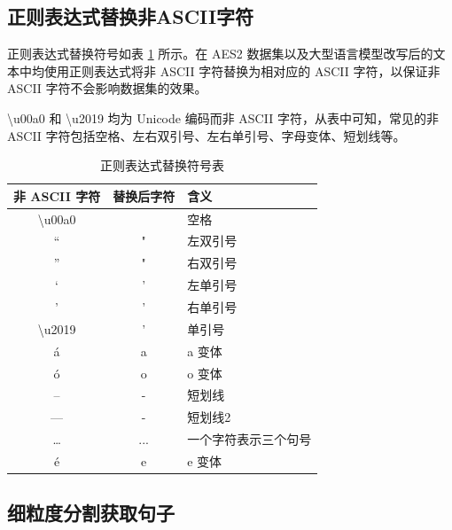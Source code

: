 \subsection{正则表达式替换非ASCII字符}
\label{sec:TOSWT-gen-reg}

正则表达式替换符号如表 \ref{tab:TOSWT-reg} 所示。在 AES2 数据集以及大型语言模型改写后的文本中均使用正则表达式将非 ASCII 字符替换为相对应的 ASCII 字符，以保证非 ASCII 字符不会影响数据集的效果。

\textbackslash{}u00a0 和 \textbackslash{}u2019 均为 Unicode 编码而非 ASCII 字符，从表中可知，常见的非 ASCII 字符包括空格、左右双引号、左右单引号、字母变体、短划线等。

\begin{table}[htbp]
    \centering
    \caption{正则表达式替换符号表} \label{tab:TOSWT-reg}
    \begin{tabular}{ccl}
    \toprule
    \textbf{非 ASCII 字符}   & \textbf{替换后字符} & \textbf{含义} \\ \midrule
    \textbackslash{}u00a0 & \              & 空格          \\
    “                     & "              & 左双引号        \\
    ”                     & "              & 右双引号        \\
    ‘                     & '              & 左单引号        \\
    ’                     & '              & 右单引号        \\
    \textbackslash{}u2019 & '              & 单引号         \\
    á                     & a              & a 变体       \\
    ó                     & o              & o 变体        \\
    –                     & -              & 短划线         \\
    —                     & -              & 短划线2        \\
    …                     & ...            & 一个字符表示三个句号  \\
    é                     & e              & e 变体         \\ \bottomrule
    \end{tabular}
\end{table}

\subsection{细粒度分割获取句子}
\label{sec:TOSWT-gen-sentence_splitter}

